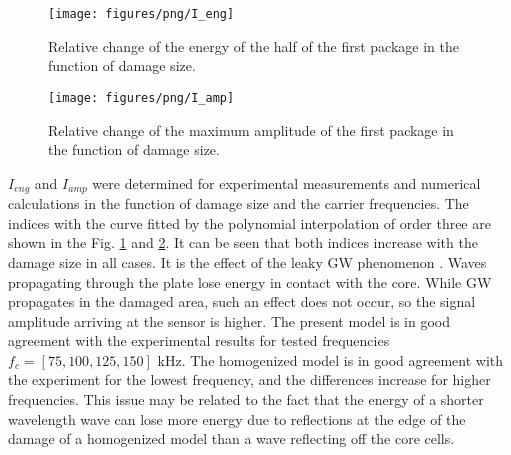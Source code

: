 \documentclass[sensors,article,submit,moreauthors,pdftex]{Definitions/mdpi}
\begin{document}
\begin{figure}
	\begin{center}
		\texttt{[image: figures/png/I\_eng]}
	\end{center}
	\caption{Relative change of the energy of the half of the first package in the function of damage size.}
	\label{fig:madif_eng}
\end{figure}
\begin{figure}
	\begin{center}
		\texttt{[image: figures/png/I\_amp]}
	\end{center}
	\caption{Relative change of the maximum amplitude of the first package in the function of damage size.}
	\label{fig:madif_amp}
\end{figure}


\(I_{eng}\) and \(I_{amp}\) were determined for experimental measurements and numerical calculations in the function of damage size and the carrier frequencies.
The indices with the curve fitted by the polynomial interpolation of order three are shown in the Fig. \ref{fig:madif_eng} and \ref{fig:madif_amp}.
It can be seen that both indices increase with the damage size in all cases.
It is the effect of the leaky GW phenomenon \cite{song2009guided}.
Waves propagating through the plate lose energy in contact with the core.
While GW propagates in the damaged area, such an effect does not occur, so the signal amplitude arriving at the sensor is higher.
The present model is in good agreement with the experimental results for tested frequencies \(f_c=[75, 100, 125, 150]\) kHz. 
The homogenized model is in good agreement with the experiment for the lowest frequency, and the differences increase for higher frequencies.
This issue may be related to the fact that the energy of a shorter wavelength wave can lose more energy due to reflections at the edge of the damage of a homogenized model than a wave reflecting off the core cells.
\end{document}
